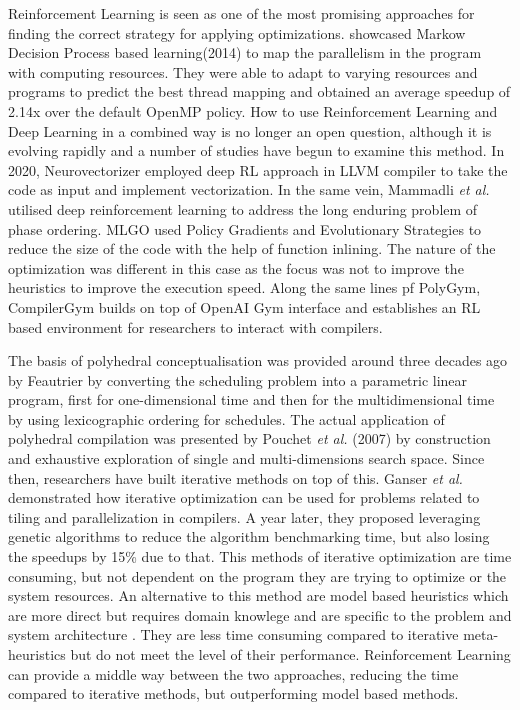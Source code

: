 \documentclass[logo,msc]{infthesis}           %
\begin{document}
Reinforcement Learning is seen as one of the most promising approaches for finding the correct strategy for applying optimizations\cite{9232934}. \cite{10.1007} showcased Markow Decision Process based learning(2014) to map the parallelism in the program with computing resources. They were able to adapt to varying resources and programs to predict the best thread mapping and obtained an average speedup of 2.14x over the default OpenMP policy. How to use Reinforcement Learning and Deep Learning in a combined way is no longer an open question, although it is evolving rapidly and a number of studies have begun to examine this method. In 2020, Neurovectorizer \cite{NeuroVectorizer} employed deep RL approach in LLVM compiler to take the code as input and implement vectorization. In the same vein,  Mammadli \textit{et al.} 
utilised deep reinforcement learning to address the long enduring problem of phase ordering. MLGO \cite{10.48550} used Policy Gradients and Evolutionary Strategies to reduce the size of the code with the help of function inlining. The nature of the optimization was different in this case as the focus was not to improve the heuristics to improve the execution speed.  Along the same lines pf PolyGym, CompilerGym \cite{CompilerGym} builds on top of OpenAI Gym interface and establishes an RL based environment for researchers to interact with compilers.

The basis of polyhedral conceptualisation was provided around three decades ago by Feautrier by converting the scheduling problem into a parametric linear program, first for one-dimensional time\cite{single} and then for the multidimensional time by using lexicographic ordering for schedules\cite{multi}. The actual application of polyhedral compilation was presented by Pouchet \textit{et al.} (2007) by construction and exhaustive exploration of single\cite{it_Single} and multi-dimensions\cite{it_multi} search space. Since then, researchers have built iterative methods on top of this. Ganser \textit{et al.} demonstrated how iterative optimization can be used for problems related to tiling and parallelization in compilers\cite{10.1145/3109482}. A year later, they proposed leveraging genetic algorithms to reduce the algorithm benchmarking time, but also losing the speedups by 15\% due to that. This methods of iterative optimization are time consuming, but not dependent on the program they are trying to optimize or the system resources. An alternative to this method are model based heuristics which are more direct but requires domain knowlege and are specific to the problem and system architecture\cite{Bondhugula07pluto:a} \cite{isl}. They are less time consuming compared to iterative meta-heuristics but do not meet the level of their performance. Reinforcement Learning can provide a middle way between the two approaches, reducing the time compared to iterative methods, but outperforming model based methods. 
\end{document}
